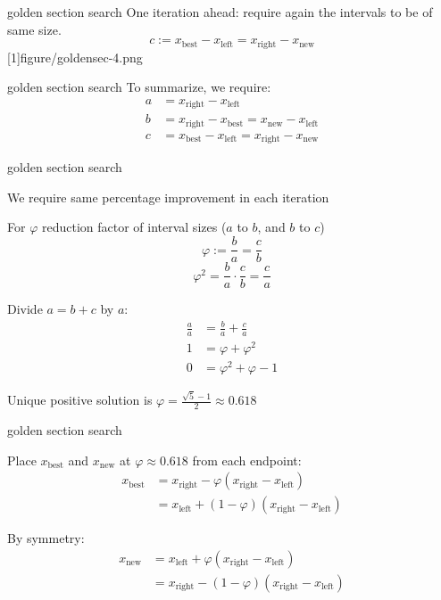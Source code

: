 \documentclass[11pt,compress,t,notes=noshow, xcolor=table]{beamer}
\newcommand{\xleft}{x_{\text{left}}}
\newcommand{\xright}{x_{\text{right}}}
\newcommand{\xnew}{x_{\text{new}}}
\newcommand{\xbest}{x_{\text{best}}}
\begin{document}
\begin{framev}[align=top]{golden section search}
One iteration ahead: require again the intervals to be of same size.
$$c := \xbest - \xleft = \xright - \xnew$$
\imageFixed{1cm}{2.5cm}[1]{figure/goldensec-4.png}
\end{framev}


\begin{framev}[align=top]{golden section search}
To summarize, we require:
\begin{align*}
a &= \xright-\xleft \\
b &= \xright - \xbest = \xnew - \xleft \\
c &= \xbest - \xleft = \xright - \xnew
\end{align*}
\end{framev}


\begin{framei}{golden section search}
\item We require same percentage improvement in each iteration
\item For $\varphi$ reduction factor of interval sizes ($a$ to $b$, and $b$ to $c$)
$$\varphi := \frac{b}{a} = \frac{c}{b}$$
$$\varphi^2 = \frac{b}{a} \cdot \frac{c}{b} = \frac{c}{a}$$
\item Divide $a = b + c$ by $a$:
\begin{align*}
\frac{a}{a} &= \frac{b}{a} + \frac{c}{a} \\
1 &= \varphi + \varphi^2 \\
0 &= \varphi^2 + \varphi - 1
\end{align*}
\item Unique positive solution is $\varphi = \frac{\sqrt{5}-1}{2} \approx 0.618$
\end{framei}


\begin{framei}[fs=normalsize,align=top]{golden section search}
\item Place $\xbest$ and $\xnew$ at $\varphi \approx 0.618$ from each endpoint:
  \begin{align*}
  \xbest &= \xright - \varphi(\xright-\xleft) \\
         &= \xleft + (1-\varphi)(\xright-\xleft)
  \end{align*}
\item By symmetry:
  \begin{align*}
  \xnew &= \xleft + \varphi(\xright-\xleft) \\
        &= \xright - (1-\varphi)(\xright-\xleft)
  \end{align*}
\vspace{-0.66cm}
\end{framei}
\end{document}
